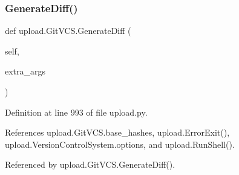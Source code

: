 \subsubsection{\texorpdfstring{Generate\+Diff()}{GenerateDiff()}\hspace{0.1cm}{\footnotesize\ttfamily [1/2]}}
{\footnotesize\ttfamily def upload.\+Git\+V\+C\+S.\+Generate\+Diff (\begin{DoxyParamCaption}\item[{}]{self,  }\item[{}]{extra\+\_\+args }\end{DoxyParamCaption})}



Definition at line 993 of file upload.\+py.



References upload.\+Git\+V\+C\+S.\+base\+\_\+hashes, upload.\+Error\+Exit(), upload.\+Version\+Control\+System.\+options, and upload.\+Run\+Shell().



Referenced by upload.\+Git\+V\+C\+S.\+Generate\+Diff().


